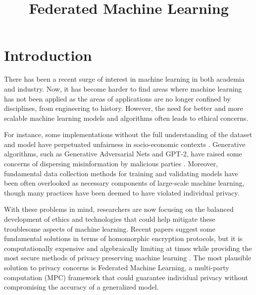 \documentclass[12pt]{article}
\begin{document}
	\title{\vspace{-10mm}Federated Machine Learning}
	\author{}

	\maketitle
	
	\section{Introduction}
	
	There has been a recent surge of interest in machine learning in both academia and industry. Now, it has become harder to find areas where machine learning has not been applied as the areas of applications are no longer confined by disciplines, from engineering to history. However, the need for better and more scalable machine learning models and algorithms often leads to ethical concerns. 
	
	\vspace{3mm}
	
	\noindent For instance, some implementations without the full understanding of the dataset and model have perpetuated unfairness in socio-economic contexts \cite{nnorient}. Generative algorithms, such as Generative Adversarial Nets and GPT-2, have raised some concerns of dispersing misinformation by malicious parties \cite{leak}. Moreover, fundamental data collection methods for training and validating models have been often overlooked as necessary components of large-scale machine learning, though many practices have been deemed to have violated individual privacy.
	
	\vspace{3mm}
	
	\noindent With these problems in mind, researchers are now focusing on the balanced development of ethics and technologies that could help mitigate these troublesome aspects of machine learning. Recent papers suggest some fundamental solutions in terms of homomorphic encryption protocols, but it is computationally expensive and algebraically limiting at times while providing the most secure methods of privacy preserving machine learning \cite{ppml}.  The most plausible solution to privacy concerns is Federated Machine Learning, a multi-party computation (MPC) framework that could guarantee individual privacy without compromising the accuracy of a generalized model. 
	
	\vspace{3mm}
	
\end{document}
